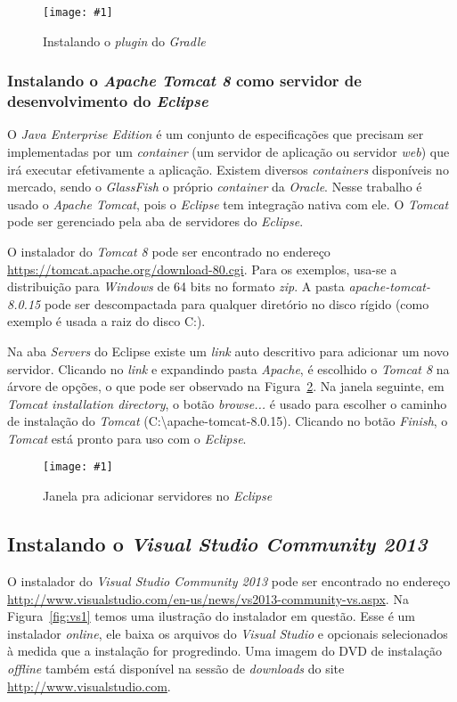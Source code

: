 \documentclass[a4paper,12pt]{article}
\newcommand{\figura}[3] {
	\begin{figure}[ht]
		\centering
		\texttt{[image: \#1]}
		\caption{#2}
		\label{#3}
	\end{figure}
	\FloatBarrier
}
\newcommand{\est}[1] {
\textit{#1}}
\begin{document}
\figura{plugin1.png}{Instalando o \est{plugin} do \est{Gradle}}{fig:gradle1}

\subsubsection{Instalando o \est{Apache Tomcat 8} como servidor de desenvolvimento do \est{Eclipse}} 

O \est{Java Enterprise Edition} é um conjunto de especificações que precisam ser implementadas por um \est{container} (um servidor de aplicação ou servidor \est{web}) que irá executar efetivamente a aplicação. Existem diversos \est{containers} disponíveis no mercado, sendo o \est{GlassFish} o próprio \est{container} da \est{Oracle}. Nesse trabalho é usado o \est{Apache Tomcat}, pois o \est{Eclipse} tem integração nativa com ele. O \est{Tomcat} pode ser gerenciado pela aba de servidores do \est{Eclipse}.

O instalador do \est{Tomcat 8} pode ser encontrado no endereço \url{https://tomcat.apache.org/download-80.cgi}. Para os exemplos, usa-se a distribuição para \est{Windows} de 64 bits no formato \est{zip}. A pasta \est{apache-tomcat-8.0.15} pode ser descompactada para qualquer diretório no disco rígido (como exemplo é usada a raiz do disco C:).  

Na aba \est{Servers} do Eclipse existe um \est{link} auto descritivo para adicionar um novo servidor. Clicando no \est{link} e expandindo pasta \est{Apache}, é escolhido o \est{Tomcat 8} na árvore de opções, o que pode ser observado na Figura~\ref{fig:tomcat1}. Na janela seguinte, em \est{Tomcat installation directory}, o botão \est{browse...} é usado para escolher o caminho de instalação do \est{Tomcat} (C:\textbackslash apache-tomcat-\textmd{8.0.15}). Clicando no botão \est{Finish}, o \est{Tomcat} está pronto para uso com o \est{Eclipse}. 

\figura{tomcat1.png}{Janela pra adicionar servidores no \est{Eclipse}}{fig:tomcat1}

\subsection{Instalando o \est{Visual Studio Community 2013}} 

O instalador do \est{Visual Studio Community 2013} pode ser encontrado no endereço \url{http://www.visualstudio.com/en-us/news/vs2013-community-vs.aspx}. Na Figura~\ref{fig:vs1} temos uma ilustração do instalador em questão. Esse é um instalador \est{online}, ele baixa os arquivos do \est{Visual Studio} e opcionais selecionados à medida que a instalação for progredindo. Uma imagem do DVD de instalação \est{offline} também está disponível na sessão de \est{downloads} do site \url{http://www.visualstudio.com}.
\end{document}
